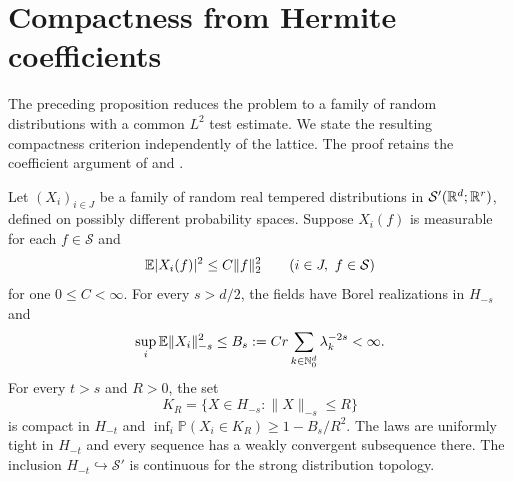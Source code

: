 \section{Compactness from Hermite coefficients}\label{sec:compactness}
The preceding proposition reduces the problem to a family of
random distributions with a common $L^2$ test estimate. We state
the resulting compactness criterion independently of the lattice.
The proof retains the coefficient argument of
\cite[Section~5.4]{QED3Manuscript} and
\cite[Section~6.1]{LatticeLimits}.

\begin{proposition}\label{prop:compactness}
Let $(X_i)_{i\in J}$ be a family of random real tempered
distributions in $\mathcal S'(\mathbb R^d;\mathbb R^r)$, defined on possibly
different probability spaces. Suppose $X_i(f)$ is
measurable for each $f\in\mathcal S$ and
\begin{equation}\label{eq:distribution-second}
 \mathbb E|X_i(f)|^2\le C\|f\|_2^2
 \qquad(i\in J,\ f\in\mathcal S)
\end{equation}
for one $0\le C<\infty$. For every $s>d/2$, the fields have
Borel realizations in $H_{-s}$ and
\begin{equation}\label{eq:hermite-expectation}
 \sup_i\mathbb E\|X_i\|_{-s}^2\le
 B_s:=Cr\sum_{k\in\mathbb N_0^d}\lambda_k^{-2s}<\infty.
\end{equation}
For every $t>s$ and $R>0$, the set
\[
 K_R=\{X\in H_{-s}:\|X\|_{-s}\le R\}
\]
is compact in $H_{-t}$ and
$\inf_i\mathbb P(X_i\in K_R)\ge1-B_s/R^2$.
The laws are uniformly tight in $H_{-t}$ and every sequence has
a weakly convergent subsequence there. The inclusion
$H_{-t}\hookrightarrow\mathcal S'$ is continuous for the strong
distribution topology.
\end{proposition}

